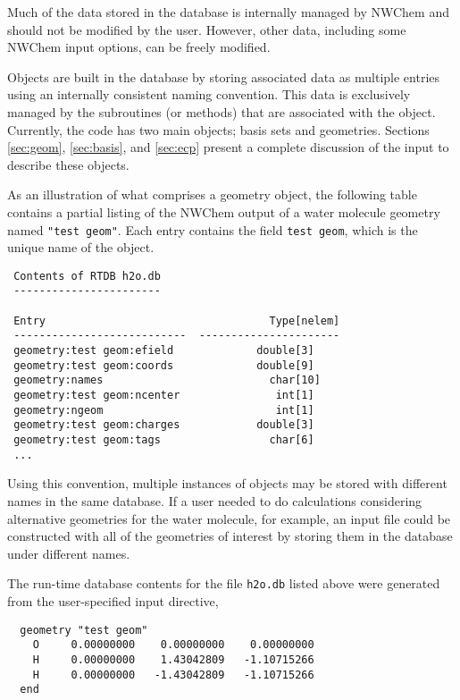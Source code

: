 Much of the data stored in the database is internally managed by
NWChem and should not be modified by the user.  However, other data,
including some NWChem input options, can be freely modified.  

Objects are built in the database by storing associated data as
multiple entries using an internally consistent naming convention.
This data is exclusively managed by the subroutines (or methods) that
are associated with the object.  Currently, the code has two main
objects; basis sets and geometries.  Sections \ref{sec:geom}, 
\ref{sec:basis}, and
\ref{sec:ecp} present a complete discussion of the input to describe
these objects.  

As an illustration of what comprises a geometry object, the following
table contains a partial listing of the NWChem output of a water molecule
geometry named \verb+"test geom"+.  Each entry contains the field 
\verb+test geom+, which is the unique name of the object.

\begin{verbatim}
 Contents of RTDB h2o.db
 -----------------------

 Entry                                   Type[nelem]
 ---------------------------  ----------------------
 geometry:test geom:efield             double[3]    
 geometry:test geom:coords             double[9]    
 geometry:names                          char[10]   
 geometry:test geom:ncenter               int[1]    
 geometry:ngeom                           int[1]    
 geometry:test geom:charges            double[3]    
 geometry:test geom:tags                 char[6]
 ...
\end{verbatim}

Using this convention, multiple instances of objects may be stored with
different names in the same database.  If a user needed to do calculations 
considering alternative geometries
for the water molecule, for example, an input file could be constructed with 
all of the geometries of interest by storing them in the 
database under different names.  


The run-time database contents for the file \verb+h2o.db+ listed 
above were generated from the user-specified input directive,
\begin{verbatim}
  geometry "test geom"
    O     0.00000000    0.00000000    0.00000000
    H     0.00000000    1.43042809   -1.10715266
    H     0.00000000   -1.43042809   -1.10715266
  end
\end{verbatim}

